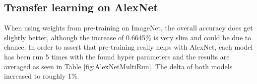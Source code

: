 \begin{table}[h]
    \caption{Accuracy (\%) for several learning rates and lr-decays for AlexNet as a baseline.}
    \centering
    \begin{small}
    \textsc{
    }
    \end{small}
    \vspace{-3.9mm}
    \label{tbl:alexnet-baseline}
\end{table}

\subsection{Transfer learning on AlexNet}

When using weights from pre-training on ImageNet, the overall accuracy does get slightly better, although the increase of 0.6645\% is very slim and could be due to chance. In order to assert that pre-training really helps with AlexNet, each model has been run 5 times with the found hyper parameters and the results are averaged as seen in Table \ref{fig:AlexNetMultiRun}. The delta of both models increased to roughly 1\%.

